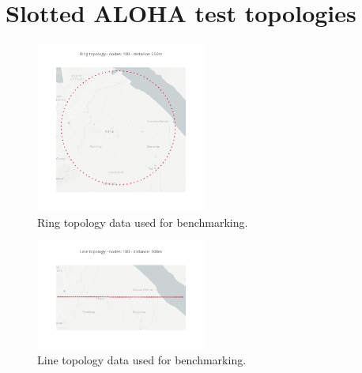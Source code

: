 \chapter{Slotted ALOHA test topologies}\label{ch:app:aloha-topologies}

\begin{figure}[ht]
    \centering
    \includegraphics[width=0.5\textwidth]{figures/aloha/ring_topology.png}
    \caption{Ring topology data used for benchmarking.}
    \label{figure:app:aloha-ring-topology}
\end{figure}

\begin{figure}[ht]
    \centering
    \includegraphics[width=0.5\textwidth]{figures/aloha/line_topology.png}
    \caption{Line topology data used for benchmarking.}
    \label{figure:app:aloha-line-topology}
\end{figure}